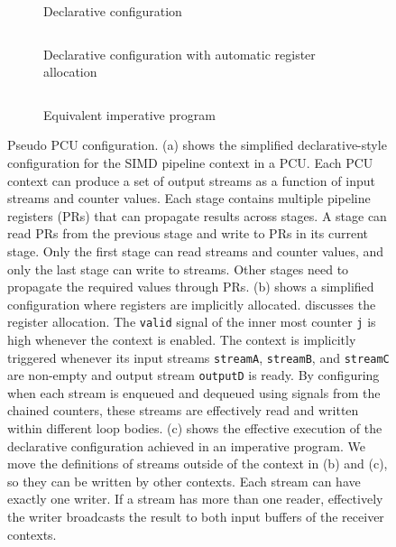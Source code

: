 \begin{figure}
  \begin{subfigure}[b]{0.5\textwidth}
    \inputminted{python}{code/contextfull.py}
    \caption{Declarative configuration}
    \label{fig:contexta}
  \end{subfigure}
  \hfill
  \begin{subfigure}[b]{0.4\textwidth}
    \inputminted{python}{code/context_dec_simple.py}
    \caption{Declarative configuration with automatic register allocation}
    \label{fig:contextb}
    \inputminted{python}{code/context_imp.py}
    \caption{Equivalent imperative program}
    \label{fig:contextc}
  \end{subfigure}
  \caption[Example PCU configuration]{
    Pseudo PCU configuration.
    (a) shows the simplified declarative-style configuration for the SIMD pipeline context in a PCU.
    Each PCU context can produce a set of output streams as a function of input streams and counter
    values.
    Each stage contains multiple pipeline registers (PRs) that can propagate results across stages.
    A stage can read PRs from the previous stage and write to PRs in its current stage.
    Only the first stage can read streams and counter values, and only the last stage can write to streams. 
    Other stages need to propagate the required values through PRs.
    (b) shows a simplified configuration where registers are implicitly allocated.
     discusses the register allocation.
    The \texttt{valid} signal of the inner most counter \texttt{j} is high whenever the context is
    enabled. The context is implicitly triggered whenever its input streams \texttt{streamA},
    \texttt{streamB}, and \texttt{streamC} are non-empty and output stream \texttt{outputD} is ready.
    By configuring when each stream is enqueued and dequeued using signals from the chained counters, 
    these streams are effectively read and written within different loop bodies.
    (c) shows the effective execution of the declarative configuration achieved in an imperative program.
    We move the definitions of streams outside of the context in (b) and (c), so they can be written by
    other contexts. 
    Each stream can have exactly one writer. 
    If a stream has more than one reader, effectively the
    writer broadcasts the result to both input buffers of the receiver contexts.
  }
  \label{fig:context}
\end{figure}

